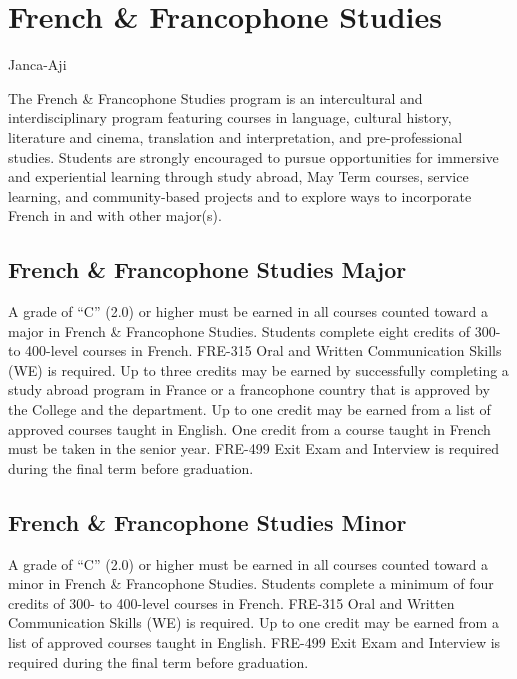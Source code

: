 \documentclass[
  letterpaper,
]{scrbook}
\begin{document}
\hypertarget{sec-french-and-francophone-studies}{%
\section{French \& Francophone
Studies}\label{sec-french-and-francophone-studies}}

Janca-Aji

The French \& Francophone Studies program is an intercultural and
interdisciplinary program featuring courses in language, cultural
history, literature and cinema, translation and interpretation, and
pre-professional studies. Students are strongly encouraged to pursue
opportunities for immersive and experiential learning through study
abroad, May Term courses, service learning, and community-based projects
and to explore ways to incorporate French in and with other major(s).

\hypertarget{french-francophone-studies-major}{%
\subsection{French \& Francophone Studies
Major}\label{french-francophone-studies-major}}

A grade of ``C'' (2.0) or higher must be earned in all courses counted
toward a major in French \& Francophone Studies. Students complete eight
credits of 300- to 400-level courses in French. FRE-315 Oral and Written
Communication Skills (WE) is required. Up to three credits may be earned
by successfully completing a study abroad program in France or a
francophone country that is approved by the College and the department.
Up to one credit may be earned from a list of approved courses taught in
English. One credit from a course taught in French must be taken in the
senior year. FRE-499 Exit Exam and Interview is required during the
final term before graduation.

\hypertarget{french-francophone-studies-minor}{%
\subsection{French \& Francophone Studies
Minor}\label{french-francophone-studies-minor}}

A grade of ``C'' (2.0) or higher must be earned in all courses counted
toward a minor in French \& Francophone Studies. Students complete a
minimum of four credits of 300- to 400-level courses in French. FRE-315
Oral and Written Communication Skills (WE) is required. Up to one credit
may be earned from a list of approved courses taught in English. FRE-499
Exit Exam and Interview is required during the final term before
graduation.
\end{document}
